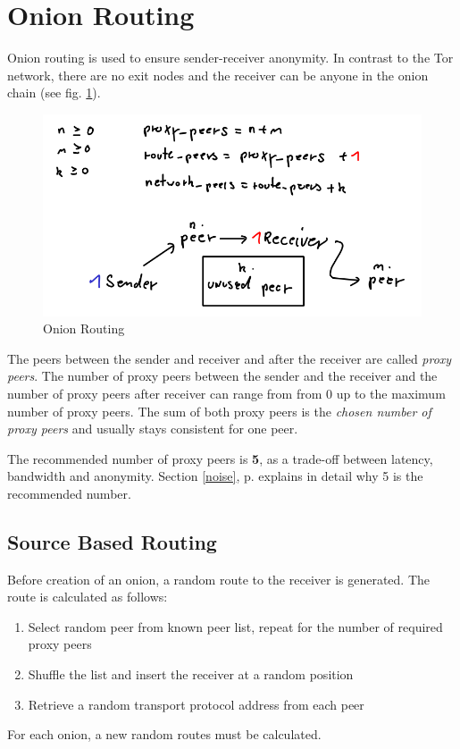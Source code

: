 \section{Onion Routing}
\label{onionrouting}
Onion routing is used to ensure sender-receiver anonymity. In contrast
to the Tor network, there are no exit nodes and the receiver can be anyone
in the onion chain (see fig. \ref{onionroutingimg}).
\begin{figure}
    \centering
    \caption{Onion Routing}
    \label{onionroutingimg}
    \includegraphics[scale=0.8]{onionrouting.png}
\end{figure}
The peers between the sender and receiver and after the receiver are
called \textit{proxy peers}. The number of proxy peers between the
sender and the receiver and the number of proxy peers after receiver
can range from from 0 up to the maximum number of proxy peers. The sum
of both proxy peers is the \textit{chosen number of proxy peers} and
usually stays consistent for one peer.

The recommended number of proxy peers is \textbf{5}, as a trade-off between
latency, bandwidth and anonymity. Section \ref{noise}, p. \pageref{noise}
explains in detail why 5 is the recommended number.
\subsection{Source Based Routing}
Before creation of an onion, a random route to the receiver is generated.
The route is calculated as follows:
\begin{enumerate}
\item Select random peer from known peer list, repeat for the number of required proxy peers
\item Shuffle the list and insert the receiver at a random position
\item Retrieve a random transport protocol address from each peer
\end{enumerate}
For each onion, a new random routes must be calculated.
